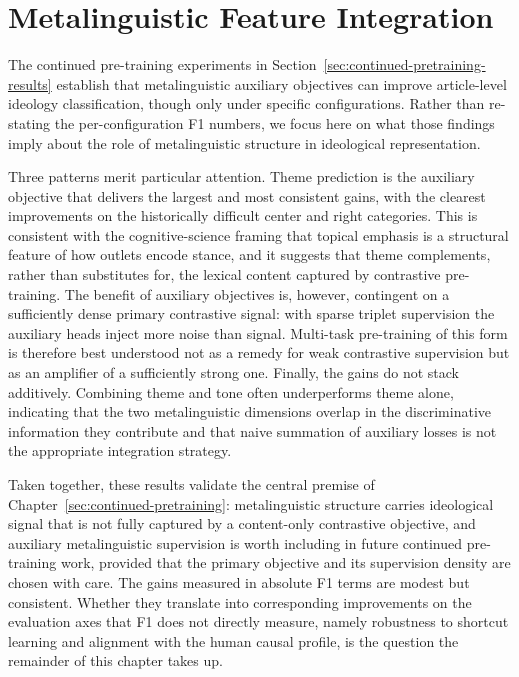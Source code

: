 \section{Metalinguistic Feature Integration}
\label{sec:metalinguistic-analysis}

The continued pre-training experiments in Section~\ref{sec:continued-pretraining-results} establish that metalinguistic auxiliary objectives can improve article-level ideology classification, though only under specific configurations. Rather than re-stating the per-configuration F1 numbers, we focus here on what those findings imply about the role of metalinguistic structure in ideological representation.

Three patterns merit particular attention. Theme prediction is the auxiliary objective that delivers the largest and most consistent gains, with the clearest improvements on the historically difficult center and right categories. This is consistent with the cognitive-science framing that topical emphasis is a structural feature of how outlets encode stance, and it suggests that theme complements, rather than substitutes for, the lexical content captured by contrastive pre-training. The benefit of auxiliary objectives is, however, contingent on a sufficiently dense primary contrastive signal: with sparse triplet supervision the auxiliary heads inject more noise than signal. Multi-task pre-training of this form is therefore best understood not as a remedy for weak contrastive supervision but as an amplifier of a sufficiently strong one. Finally, the gains do not stack additively. Combining theme and tone often underperforms theme alone, indicating that the two metalinguistic dimensions overlap in the discriminative information they contribute and that naive summation of auxiliary losses is not the appropriate integration strategy.

Taken together, these results validate the central premise of Chapter~\ref{sec:continued-pretraining}: metalinguistic structure carries ideological signal that is not fully captured by a content-only contrastive objective, and auxiliary metalinguistic supervision is worth including in future continued pre-training work, provided that the primary objective and its supervision density are chosen with care. The gains measured in absolute F1 terms are modest but consistent. Whether they translate into corresponding improvements on the evaluation axes that F1 does not directly measure, namely robustness to shortcut learning and alignment with the human causal profile, is the question the remainder of this chapter takes up.

